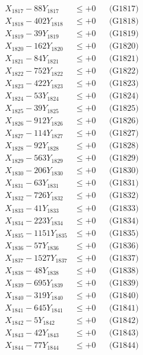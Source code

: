 \documentclass[a4paper,10pt]{article}
\begin{document}
{\begin{align}
X_{1817} - 88Y_{1817} &\leq +0 && \text{(G1817)} \\
X_{1818} - 402Y_{1818} &\leq +0 && \text{(G1818)} \\
X_{1819} - 39Y_{1819} &\leq +0 && \text{(G1819)} \\
X_{1820} - 162Y_{1820} &\leq +0 && \text{(G1820)} \\
\allowbreak
X_{1821} - 84Y_{1821} &\leq +0 && \text{(G1821)} \\
X_{1822} - 752Y_{1822} &\leq +0 && \text{(G1822)} \\
X_{1823} - 422Y_{1823} &\leq +0 && \text{(G1823)} \\
X_{1824} - 53Y_{1824} &\leq +0 && \text{(G1824)} \\
X_{1825} - 39Y_{1825} &\leq +0 && \text{(G1825)} \\
X_{1826} - 912Y_{1826} &\leq +0 && \text{(G1826)} \\
X_{1827} - 114Y_{1827} &\leq +0 && \text{(G1827)} \\
X_{1828} - 92Y_{1828} &\leq +0 && \text{(G1828)} \\
X_{1829} - 563Y_{1829} &\leq +0 && \text{(G1829)} \\
X_{1830} - 206Y_{1830} &\leq +0 && \text{(G1830)} \\
\allowbreak
X_{1831} - 63Y_{1831} &\leq +0 && \text{(G1831)} \\
X_{1832} - 726Y_{1832} &\leq +0 && \text{(G1832)} \\
X_{1833} - 41Y_{1833} &\leq +0 && \text{(G1833)} \\
X_{1834} - 223Y_{1834} &\leq +0 && \text{(G1834)} \\
X_{1835} - 1151Y_{1835} &\leq +0 && \text{(G1835)} \\
X_{1836} - 57Y_{1836} &\leq +0 && \text{(G1836)} \\
X_{1837} - 1527Y_{1837} &\leq +0 && \text{(G1837)} \\
X_{1838} - 48Y_{1838} &\leq +0 && \text{(G1838)} \\
X_{1839} - 695Y_{1839} &\leq +0 && \text{(G1839)} \\
X_{1840} - 319Y_{1840} &\leq +0 && \text{(G1840)} \\
\allowbreak
X_{1841} - 645Y_{1841} &\leq +0 && \text{(G1841)} \\
X_{1842} - 5Y_{1842} &\leq +0 && \text{(G1842)} \\
X_{1843} - 42Y_{1843} &\leq +0 && \text{(G1843)} \\
X_{1844} - 77Y_{1844} &\leq +0 && \text{(G1844)} \\

\end{align}}
\end{document}
